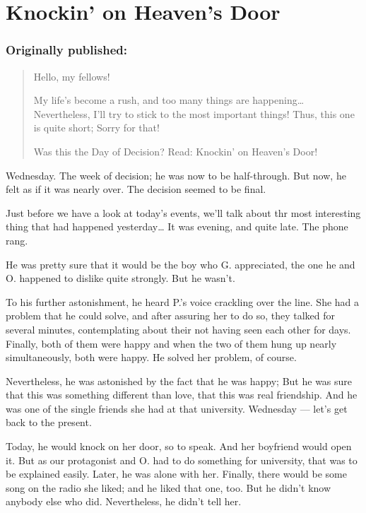 \chapter{Knockin' on Heaven's Door}
\label{cha:knockin-heavens-door}
\subsection*{Originally published: }
\begin{quote}
Hello, my fellows!

My life's become a rush, and too many things are happening\ldots
Nevertheless, I'll try to stick to the most important things!
Thus, this one is quite short; Sorry for that!

Was this the Day of Decision? Read: Knockin' on Heaven's Door!
\end{quote}

Wednesday. 
The week of decision; he was now to be half-through. 
But now, he felt as if it was nearly over. 
The decision seemed to be final.

Just before we have a look at today's events, we'll talk about thr most interesting thing that had happened yesterday\ldots
It was evening, and quite late. 
The phone rang.

He was pretty sure that it would be the boy who G. appreciated, the one he and O. happened to dislike quite strongly. 
But he wasn't.

To his further astonishment, he heard P.'s voice crackling over the line. 
She had a problem that he could solve, and after assuring her to do so, they talked for several minutes, contemplating about their not having seen each other for days. 
Finally, both of them were happy and when the two of them hung up nearly simultaneously, both were happy. 
He solved her problem, of course.

Nevertheless, he was astonished by the fact that he was happy; But he was sure that this was something different than love, that this was real friendship. 
And he was one of the single friends she had at that university. 
Wednesday --- let's get back to the present.

Today, he would knock on her door, so to speak. 
And her boyfriend would open it. 
But as our protagonist and O. had to do something for university, that was to be explained easily. 
Later, he was alone with her. Finally, there would be some song on the radio she liked; and he liked that one, too. 
But he didn't know anybody else who did. 
Nevertheless, he didn't tell her.


